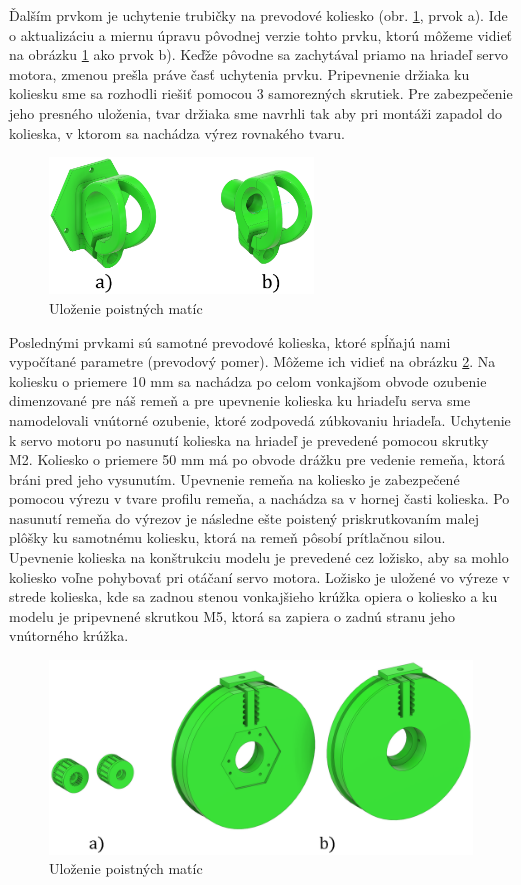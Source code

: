 Ďalším prvkom je uchytenie trubičky na prevodové koliesko (obr. \ref{OBRAZOK 2.5.4}, prvok a). Ide o aktualizáciu a miernu úpravu pôvodnej verzie tohto prvku, ktorú môžeme vidieť na obrázku \ref{OBRAZOK 2.5.4} ako prvok b). Keďže pôvodne sa zachytával priamo na hriadeľ servo motora, zmenou prešla práve časť uchytenia prvku. Pripevnenie držiaka ku koliesku sme sa rozhodli riešiť pomocou 3 samorezných skrutiek. Pre zabezpečenie jeho presného uloženia, tvar držiaka sme navrhli tak aby pri montáži zapadol do kolieska, v ktorom sa nachádza výrez rovnakého tvaru. 

\begin{figure}[]
	\centering
	\includegraphics[width=70mm]{obr/3Ddrziak.eps}
	\caption{Uloženie poistných matíc}\label{OBRAZOK 2.5.4} 
\end{figure} 

Poslednými prvkami sú samotné prevodové kolieska, ktoré spĺňajú nami vypočítané parametre (prevodový pomer). Môžeme ich vidieť na obrázku \ref{OBRAZOK 2.5.5}. Na koliesku o priemere 10 mm sa nachádza po celom vonkajšom obvode ozubenie dimenzované pre náš remeň a pre upevnenie kolieska ku hriadeľu serva sme namodelovali vnútorné ozubenie, ktoré zodpovedá zúbkovaniu hriadeľa. Uchytenie k servo motoru po nasunutí kolieska na hriadeľ je prevedené pomocou skrutky M2. Koliesko o priemere 50 mm má po obvode drážku pre vedenie remeňa, ktorá bráni pred jeho vysunutím. Upevnenie remeňa na koliesko je zabezpečené pomocou výrezu v tvare profilu remeňa, a nachádza sa v hornej časti kolieska. Po nasunutí remeňa do výrezov je následne ešte poistený priskrutkovaním malej plôšky ku samotnému koliesku, ktorá na remeň pôsobí prítlačnou silou. Upevnenie kolieska na konštrukciu modelu je prevedené cez ložisko, aby sa mohlo koliesko voľne pohybovať pri otáčaní servo motora. Ložisko je uložené vo výreze v strede kolieska, kde sa zadnou stenou vonkajšieho krúžka opiera o koliesko a ku modelu je pripevnené skrutkou M5, ktorá sa zapiera o zadnú stranu jeho vnútorného krúžka.   
 
 \begin{figure}[]
 	\centering
 	\includegraphics[width=150mm]{obr/3Dkolieska.eps}
 	\caption{Uloženie poistných matíc}\label{OBRAZOK 2.5.5} 
 \end{figure} 